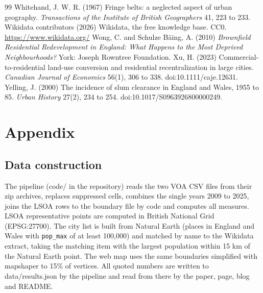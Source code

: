 \documentclass[11pt,a4paper]{article}
\begin{document}
\begin{thebibliography}{99}
 Whitehand, J. W. R. (1967) Fringe belts: a neglected aspect of urban geography. \textit{Transactions of the Institute of British Geographers} 41, 223 to 233.
 Wikidata contributors (2026) Wikidata, the free knowledge base. CC0. \url{https://www.wikidata.org/}
 Wong, C. and Schulze B\"aing, A. (2010) \textit{Brownfield Residential Redevelopment in England: What Happens to the Most Deprived Neighbourhoods?} York: Joseph Rowntree Foundation.
 Xu, H. (2023) Commercial-to-residential land-use conversion and residential recentralization in large cities. \textit{Canadian Journal of Economics} 56(1), 306 to 338. doi:10.1111/caje.12631.
 Yelling, J. (2000) The incidence of slum clearance in England and Wales, 1955 to 85. \textit{Urban History} 27(2), 234 to 254. doi:10.1017/S0963926800000249.
\end{thebibliography}

\clearpage
\appendix
\section{Appendix}
\subsection{Data construction}
The pipeline (code/ in the repository) reads the two VOA CSV files from their zip archives, replaces suppressed cells, combines the single years 2009 to 2025, joins the LSOA rows to the boundary file by code and computes all measures. LSOA representative points are computed in British National Grid (EPSG:27700). The city list is built from Natural Earth (places in England and Wales with \texttt{pop\_max} of at least 100,000) and matched by name to the Wikidata extract, taking the matching item with the largest population within 15 km of the Natural Earth point. The web map uses the same boundaries simplified with mapshaper to 15\% of vertices. All quoted numbers are written to data/results.json by the pipeline and read from there by the paper, page, blog and README.
\end{document}
